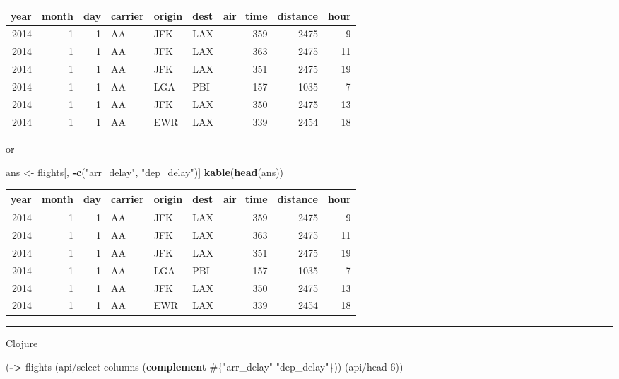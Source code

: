 \documentclass[]{article}
\newenvironment{Shaded}{\begin{snugshade}}{\end{snugshade}}
\newcommand{\KeywordTok}[1]{\textcolor[rgb]{0.13,0.29,0.53}{\textbf{#1}}}
\newcommand{\DecValTok}[1]{\textcolor[rgb]{0.00,0.00,0.81}{#1}}
\newcommand{\StringTok}[1]{\textcolor[rgb]{0.31,0.60,0.02}{#1}}
\newcommand{\OperatorTok}[1]{\textcolor[rgb]{0.81,0.36,0.00}{\textbf{#1}}}
\newcommand{\NormalTok}[1]{#1}
\begin{document}
\begin{longtable}[]{@{}rrrlllrrr@{}}
\toprule
year & month & day & carrier & origin & dest & air\_time & distance &
hour\tabularnewline
\midrule
\endhead
2014 & 1 & 1 & AA & JFK & LAX & 359 & 2475 & 9\tabularnewline
2014 & 1 & 1 & AA & JFK & LAX & 363 & 2475 & 11\tabularnewline
2014 & 1 & 1 & AA & JFK & LAX & 351 & 2475 & 19\tabularnewline
2014 & 1 & 1 & AA & LGA & PBI & 157 & 1035 & 7\tabularnewline
2014 & 1 & 1 & AA & JFK & LAX & 350 & 2475 & 13\tabularnewline
2014 & 1 & 1 & AA & EWR & LAX & 339 & 2454 & 18\tabularnewline
\bottomrule
\end{longtable}

or

\begin{Shaded}
\begin{Highlighting}[]
\NormalTok{ans <-}\StringTok{ }\NormalTok{flights[, }\OperatorTok{-}\KeywordTok{c}\NormalTok{(}\StringTok{"arr_delay"}\NormalTok{, }\StringTok{"dep_delay"}\NormalTok{)]}
\KeywordTok{kable}\NormalTok{(}\KeywordTok{head}\NormalTok{(ans))}
\end{Highlighting}
\end{Shaded}

\begin{longtable}[]{@{}rrrlllrrr@{}}
\toprule
year & month & day & carrier & origin & dest & air\_time & distance &
hour\tabularnewline
\midrule
\endhead
2014 & 1 & 1 & AA & JFK & LAX & 359 & 2475 & 9\tabularnewline
2014 & 1 & 1 & AA & JFK & LAX & 363 & 2475 & 11\tabularnewline
2014 & 1 & 1 & AA & JFK & LAX & 351 & 2475 & 19\tabularnewline
2014 & 1 & 1 & AA & LGA & PBI & 157 & 1035 & 7\tabularnewline
2014 & 1 & 1 & AA & JFK & LAX & 350 & 2475 & 13\tabularnewline
2014 & 1 & 1 & AA & EWR & LAX & 339 & 2454 & 18\tabularnewline
\bottomrule
\end{longtable}

\begin{center}\rule{0.5\linewidth}{0.5pt}\end{center}

Clojure

\begin{Shaded}
\begin{Highlighting}[]
\NormalTok{(}\KeywordTok{->}\NormalTok{ flights}
\NormalTok{    (api/select-columns (}\KeywordTok{complement}\NormalTok{ #\{}\StringTok{"arr_delay"} \StringTok{"dep_delay"}\NormalTok{\}))}
\NormalTok{    (api/head }\DecValTok{6}\NormalTok{))}
\end{Highlighting}
\end{Shaded}
\end{document}
